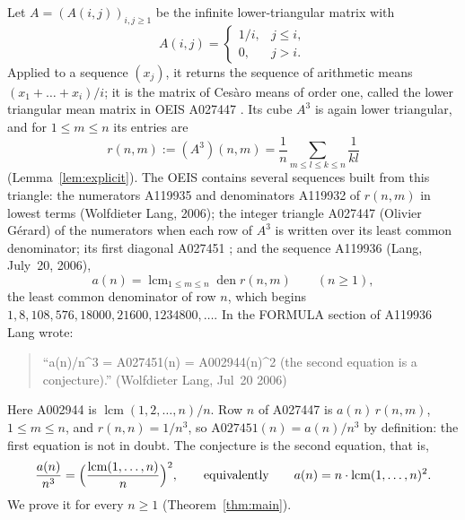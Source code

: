 \documentclass[11pt]{amsart}
\theoremstyle{plain}
\theoremstyle{definition}
\DeclareMathOperator{\lcm}{lcm}
\DeclareMathOperator{\den}{den}
\begin{document}
Let $A=(A(i,j))_{i,j\ge1}$ be the infinite lower-triangular matrix with
\[
  A(i,j)=\begin{cases}1/i,& j\le i,\\ 0,& j>i.\end{cases}
\]
Applied to a sequence $(x_j)$, it returns the sequence of arithmetic means $(x_1+\dots+x_i)/i$; it is the matrix of Ces\`aro means of order one, called the lower triangular mean matrix in OEIS A027447 \cite{A027447}. Its cube $A^3$ is again lower triangular, and for $1\le m\le n$ its entries are
\begin{equation}\label{eq:r}
  r(n,m):=(A^3)(n,m)=\frac1n\sum_{m\le l\le k\le n}\frac1{kl}
\end{equation}
(Lemma~\ref{lem:explicit}). The OEIS contains several sequences built from this triangle: the numerators A119935 \cite{A119935} and denominators A119932 \cite{A119932} of $r(n,m)$ in lowest terms (Wolfdieter Lang, 2006); the integer triangle A027447 \cite{A027447} (Olivier G\'erard) of the numerators when each row of $A^3$ is written over its least common denominator; its first diagonal A027451 \cite{A027451}; and the sequence A119936 \cite{A119936} (Lang, July~20, 2006),
\[
  a(n)=\lcm_{1\le m\le n}\den r(n,m)\qquad(n\ge1),
\]
the least common denominator of row $n$, which begins $1, 8, 108, 576, 18000, 21600, 1234800,\dots$. In the FORMULA section of A119936 Lang wrote:
\begin{quote}
``a(n)/n\^{}3 = A027451(n) = A002944(n)\^{}2 (the second equation is a conjecture).'' (Wolfdieter Lang, Jul~20 2006)
\end{quote}
Here A002944 \cite{A002944} is $\lcm(1,2,\dots,n)/n$. Row $n$ of A027447 is $a(n)\,r(n,m)$, $1\le m\le n$, and $r(n,n)=1/n^3$, so $\mathrm{A027451}(n)=a(n)/n^3$ by definition: the first equation is not in doubt. The conjecture is the second equation, that is,
\[
  \frac{a(n)}{n^3}=\Bigl(\frac{\lcm(1,\dots,n)}{n}\Bigr)^2,\qquad\text{equivalently}\qquad a(n)=n\cdot\lcm(1,\dots,n)^2 .
\]
We prove it for every $n\ge1$ (Theorem~\ref{thm:main}).
\end{document}
